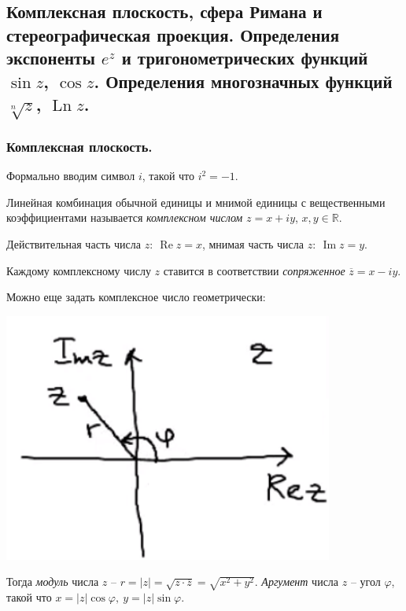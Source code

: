 \subsection{Комплексная плоскость, сфера Римана и стереографическая проекция. Определения экспоненты $e^z$ и тригонометрических функций $\sin z$, $\cos z$. Определения многозначных функций $\sqrt[n]{z}$, $\operatorname{Ln} z$.}

\subsubsection{Комплексная плоскость.}
 
 Формально вводим символ $i$, такой что $i^2 = -1$.
 
 \begin{definition*} Линейная комбинация обычной единицы и мнимой единицы с вещественными коэффициентами называется \textit{комплексном числом} $z = x + iy$, $x, y \in \mathbb{R}$.  
 	
 Действительная часть числа $z:\ \operatorname{Re} z = x$, мнимая часть числа $z:\ \operatorname{Im} z = y$.
 \end{definition*}
 
 \begin{definition*}
 Каждому комплексному числу $z$ ставится в соответствии \textit{сопряженное}  $\overline{z} = x - iy$.
\end{definition*}
 Можно еще задать комплексное число геометрически:
 
 \includegraphics[scale=0.5]{img/1.png}
 
 \begin{definition*}
 Тогда \textit{модуль} числа $z$ -- $r = |z| = \sqrt{z \cdot \overline{z}} = \sqrt{x^2 + y^2}$.
  \textit{Аргумент} числа $z$ -- угол $\varphi$, такой что $x = |z| \cos \varphi,\ y = |z| \sin \varphi$. \end{definition*}
  
